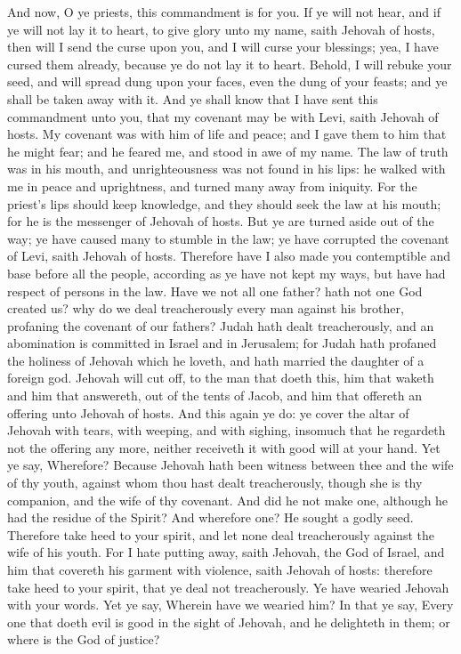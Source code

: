 And now, O ye priests, this commandment is for you. If ye will not hear, and if ye will not lay it to heart, to give glory unto my name, saith Jehovah of hosts, then will I send the curse upon you, and I will curse your blessings; yea, I have cursed them already, because ye do not lay it to heart. Behold, I will rebuke your seed, and will spread dung upon your faces, even the dung of your feasts; and ye shall be taken away with it. And ye shall know that I have sent this commandment unto you, that my covenant may be with Levi, saith Jehovah of hosts. My covenant was with him of life and peace; and I gave them to him that he might fear; and he feared me, and stood in awe of my name. The law of truth was in his mouth, and unrighteousness was not found in his lips: he walked with me in peace and uprightness, and turned many away from iniquity. For the priest’s lips should keep knowledge, and they should seek the law at his mouth; for he is the messenger of Jehovah of hosts. But ye are turned aside out of the way; ye have caused many to stumble in the law; ye have corrupted the covenant of Levi, saith Jehovah of hosts. Therefore have I also made you contemptible and base before all the people, according as ye have not kept my ways, but have had respect of persons in the law.  Have we not all one father? hath not one God created us? why do we deal treacherously every man against his brother, profaning the covenant of our fathers? Judah hath dealt treacherously, and an abomination is committed in Israel and in Jerusalem; for Judah hath profaned the holiness of Jehovah which he loveth, and hath married the daughter of a foreign god. Jehovah will cut off, to the man that doeth this, him that waketh and him that answereth, out of the tents of Jacob, and him that offereth an offering unto Jehovah of hosts. And this again ye do: ye cover the altar of Jehovah with tears, with weeping, and with sighing, insomuch that he regardeth not the offering any more, neither receiveth it with good will at your hand. Yet ye say, Wherefore? Because Jehovah hath been witness between thee and the wife of thy youth, against whom thou hast dealt treacherously, though she is thy companion, and the wife of thy covenant. And did he not make one, although he had the residue of the Spirit? And wherefore one? He sought a godly seed. Therefore take heed to your spirit, and let none deal treacherously against the wife of his youth. For I hate putting away, saith Jehovah, the God of Israel, and him that covereth his garment with violence, saith Jehovah of hosts: therefore take heed to your spirit, that ye deal not treacherously.  Ye have wearied Jehovah with your words. Yet ye say, Wherein have we wearied him? In that ye say, Every one that doeth evil is good in the sight of Jehovah, and he delighteth in them; or where is the God of justice? 

